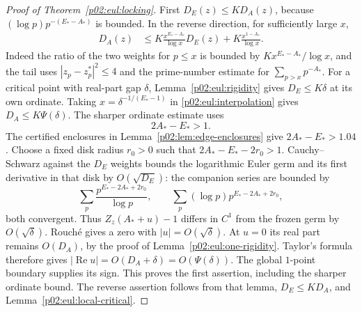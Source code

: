 \documentclass[11pt,letterpaper]{article}
\theoremstyle{definition}
\theoremstyle{remark}
\renewcommand{\Re}{\operatorname{Re}}
\newcommand{\1}{\mathbf 1}
\begin{document}
\begin{proof}[Proof of Theorem~\ref{p02:eul:locking}]
First $D_E(z)\le KD_A(z)$, because
$(\log p)p^{-(E_*-A_*)}$ is bounded. In the reverse direction,
for sufficiently large $x$,
\begin{align}\label{p02:eul:interpolation}
 D_A(z)
 &\le K\frac{x^{E_*-A_*}}{\log x}D_E(z)
       +K\frac{x^{1-A_*}}{\log x}.
\end{align}
Indeed the ratio of the two weights for $p\le x$ is bounded by
$Kx^{E_*-A_*}/\log x$, and the tail uses
$|z_p-z_p^*|^2\le4$ and the prime-number estimate for
$\sum_{p>x}p^{-A_*}$.
For a critical point with real-part gap $\delta$,
Lemma~\ref{p02:eul:rigidity} gives $D_E\le K\delta$ at its own
ordinate. Taking $x=\delta^{-1/(E_*-1)}$ in
\eqref{p02:eul:interpolation} gives $D_A\le K\Psi(\delta)$.
The sharper ordinate estimate uses
\begin{equation}\label{p02:eul:crossweight}
 2A_*-E_*>1.
\end{equation}
The certified enclosures in Lemma~\ref{p02:lem:edge-enclosures} give
$2A_*-E_*>1.04$. Choose a fixed disk radius $r_0>0$ such that
$2A_*-E_*-2r_0>1$. Cauchy--Schwarz against the $D_E$ weights
bounds the logarithmic Euler germ and its first derivative in that
disk by $O(\sqrt{D_E})$: the companion series are bounded by
\[
 \sum_p\frac{p^{E_*-2A_*+2r_0}}{\log p},\qquad
 \sum_p(\log p)p^{E_*-2A_*+2r_0},
\]
both convergent. Thus $Z_z(A_*+u)-1$ differs in $C^1$ from the
frozen germ by $O(\sqrt\delta)$. Rouch\'e gives a zero with
$|u|=O(\sqrt\delta)$. At $u=0$ its real part remains $O(D_A)$,
by the proof of Lemma~\ref{p02:eul:one-rigidity}. Taylor's formula
therefore gives $|\Re u|=O(D_A+\delta)=O(\Psi(\delta))$.
The global $1$-point boundary supplies its sign. This proves the
first assertion, including the sharper ordinate bound.
The reverse assertion follows from that lemma, $D_E\le KD_A$,
and Lemma~\ref{p02:eul:local-critical}.


\end{proof}
\end{document}
